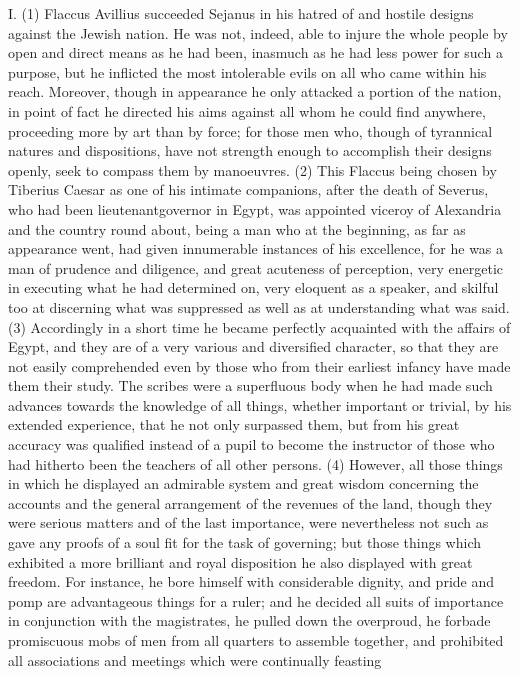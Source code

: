 I. (1) Flaccus Avillius succeeded Sejanus in his hatred of and hostile designs against the Jewish
nation. He was not, indeed, able to injure the whole people by open and direct means as he had
been, inasmuch as he had less power for such a purpose, but he inflicted the most intolerable evils
on all who came within his reach. Moreover, though in appearance he only attacked a portion of
the nation, in point of fact he directed his aims against all whom he could find anywhere,
proceeding more by art than by force; for those men who, though of tyrannical natures and
dispositions, have not strength enough to accomplish their designs openly, seek to compass them
by manoeuvres. (2) This Flaccus being chosen by Tiberius Caesar as one of his intimate
companions, after the death of Severus, who had been lieutenantgovernor in Egypt, was appointed
viceroy of Alexandria and the country round about, being a man who at the beginning, as far as
appearance went, had given innumerable instances of his excellence, for he was a man of
prudence and diligence, and great acuteness of perception, very energetic in executing what he
had determined on, very eloquent as a speaker, and skilful too at discerning what was suppressed
as well as at understanding what was said. (3) Accordingly in a short time he became perfectly
acquainted with the affairs of Egypt, and they are of a very various and diversified character, so
that they are not easily comprehended even by those who from their earliest infancy have made
them their study. The scribes were a superfluous body when he had made such advances towards
the knowledge of all things, whether important or trivial, by his extended experience, that he not only
surpassed them, but from his great accuracy was qualified instead of a pupil to become the
instructor of those who had hitherto been the teachers of all other persons. (4) However, all those
things in which he displayed an admirable system and great wisdom concerning the accounts and
the general arrangement of the revenues of the land, though they were serious matters and of the
last importance, were nevertheless not such as gave any proofs of a soul fit for the task of
governing; but those things which exhibited a more brilliant and royal disposition he also displayed
with great freedom. For instance, he bore himself with considerable dignity, and pride and pomp
are advantageous things for a ruler; and he decided all suits of importance in conjunction with the
magistrates, he pulled down the overproud, he forbade promiscuous mobs of men from all quarters
to assemble together, and prohibited all associations and meetings which were continually feasting
